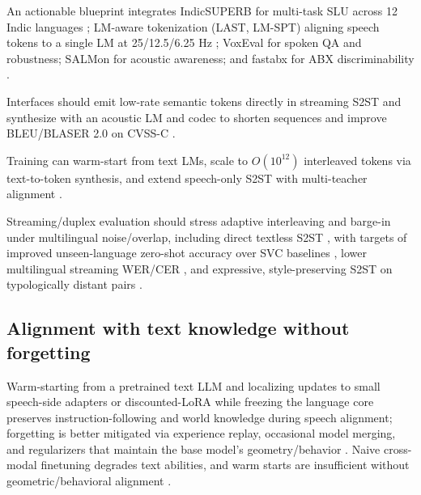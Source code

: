 \documentclass{article}
\begin{document}
An actionable blueprint integrates IndicSUPERB for multi-task SLU across 12 Indic languages \cite{entry2025indicsuperbspeechprocessinguniversalperf}; LM-aware tokenization (LAST, LM-SPT) aligning speech tokens to a single LM at 25/12.5/6.25 Hz \cite{turetzky2024lastlanguagemodelawarespeechtokenization,jo2025lmsptalignedsemanticdistillationspeechto}; VoxEval for spoken QA and robustness; SALMon for acoustic awareness; and fastabx for ABX discriminability \cite{cui2025voxevalbenchmarkingknowledgeunderstandin,maimon2025salmonsuiteacousticlanguagemodelevaluati,poli2025fastabxlibraryefficientcomputationabxdis}. 

Interfaces should emit low-rate semantic tokens directly in streaming S2ST and synthesize with an acoustic LM and codec to shorten sequences and improve BLEU/BLASER 2.0 on CVSS-C \cite{zhao2024textlessstreamingspeechtranslationsemant,jo2025lmsptalignedsemanticdistillationspeechto}. 

Training can warm-start from text LMs, scale to $O(10^{12})$ interleaved tokens via text-to-token synthesis, and extend speech-only S2ST with multi-teacher alignment \cite{hassid2024textuallypretrainedspeechlanguagemodels,turetzky2024lastlanguagemodelawarespeechtokenization,zeng2024scalingspeechtextpretrainingsyntheticint}. 

Streaming/duplex evaluation should stress adaptive interleaving and barge-in under multilingual noise/overlap, including direct textless S2ST \cite{hu2025salmduplexefficientdirectmodelingspeechl,zhao2024textlessstreamingspeechtranslationsemant,wang2023slmbridgethingapbetweenspeechtextfoundat}, with targets of improved unseen-language zero-shot accuracy over SVC baselines \cite{hsu2024exploringcontextlearningtextlessspeechla}, lower multilingual streaming WER/CER \cite{li2025transsionmultilingualspeechrecognitionsy}, and expressive, style-preserving S2ST on typologically distant pairs \cite{huang2023holisticcascadesystembenchmarkhumanevalu}.

\subsection{Alignment with text knowledge without forgetting} \label{subsec:Alignment with text knowledge without forgetting}

Warm-starting from a pretrained text LLM and localizing updates to small speech-side adapters or discounted-LoRA while freezing the language core preserves instruction-following and world knowledge during speech alignment; forgetting is better mitigated via experience replay, occasional model merging, and regularizers that maintain the base model's geometry/behavior \cite{hsiao2025analyzingmitigationstrategiescatastrophi,hassid2024textuallypretrainedspeechlanguagemodels,lu2024destaenhancingspeechlanguagemodelsthroug,wang2023slmbridgethingapbetweenspeechtextfoundat}. Naive cross-modal finetuning degrades text abilities, and warm starts are insufficient without geometric/behavioral alignment \cite{peng2024mslms2stmultitaskspeechlanguagemodeltext}.
\end{document}
